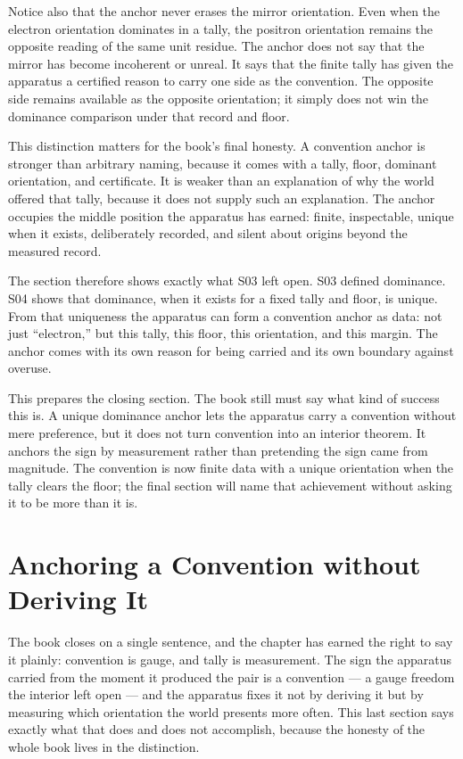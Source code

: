 Notice also that the anchor never erases the mirror orientation. Even when the
electron orientation dominates in a tally, the positron orientation remains the
opposite reading of the same unit residue. The anchor does not say that the
mirror has become incoherent or unreal. It says that the finite tally has given
the apparatus a certified reason to carry one side as the convention. The
opposite side remains available as the opposite orientation; it simply does not
win the dominance comparison under that record and floor.

This distinction matters for the book's final honesty. A convention anchor is
stronger than arbitrary naming, because it comes with a tally, floor, dominant
orientation, and certificate. It is weaker than an explanation of why the world
offered that tally, because it does not supply such an explanation. The anchor
occupies the middle position the apparatus has earned: finite, inspectable,
unique when it exists, deliberately recorded, and silent about origins beyond
the measured record.

The section therefore shows exactly what S03 left open. S03 defined
dominance. S04 shows that dominance, when it exists for a fixed tally and
floor, is unique. From that uniqueness the apparatus can form a convention
anchor as data: not just ``electron,'' but this tally, this floor, this
orientation, and this margin. The anchor comes with its own reason for being
carried and its own boundary against overuse.

This prepares the closing section. The book still must say what kind of
success this is. A unique dominance anchor lets the apparatus carry a
convention without mere preference, but it does not turn convention into an
interior theorem. It anchors the sign by measurement rather than pretending the
sign came from magnitude. The convention is now finite data with a unique
orientation when the tally clears the floor; the final section will name that
achievement without asking it to be more than it is.

\section{Anchoring a Convention without Deriving It}

The book closes on a single sentence, and the chapter has earned the right to say it
plainly: convention is gauge, and tally is measurement. The sign the apparatus carried from
the moment it produced the pair is a convention --- a gauge freedom the interior left open ---
and the apparatus fixes it not by deriving it but by measuring which orientation the world
presents more often. This last section says exactly what that does and does not accomplish,
because the honesty of the whole book lives in the distinction.

